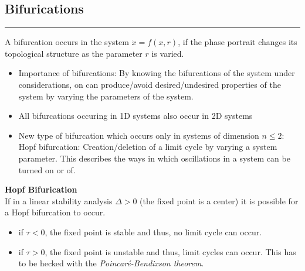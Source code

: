\subsection{Bifurications}
\noindent\rule[\linienAbstand]{\linewidth}{\linienDicke}
A bifurcation occurs in the system $\dot{x} = f(x, r)$, if the phase portrait changes its topological structure as the parameter $r$ is varied.\\

\begin{itemize}
  \item Importance of bifurcations: By knowing the bifurcations of the system under considerations, on can produce/avoid desired/undesired properties of the system by varying the parameters of the system.
  \item All bifurcations occuring in 1D systems also occur in 2D systems
  \item New type of bifurcation which occurs only in systems of dimension $n \leq 2$: Hopf bifurcation: Creation/deletion of a limit cycle by varying a system parameter. This describes the ways in which oscillations in a system can be turned on or of.
\end{itemize}

\textbf{Hopf Bifurication}\\
If in a linear stability analysis $\Delta > 0$ (the fixed point is a center) it is possible for a Hopf bifurcation to occur.
\begin{itemize}
  \item if $\tau < 0$, the fixed point is stable and thus, no limit cycle can occur.
  \item if $\tau > 0$, the fixed point is unstable and thus, limit cycles can occur. This has to be hecked with the \emph{Poincaré-Bendixson theorem}.
\end{itemize}
